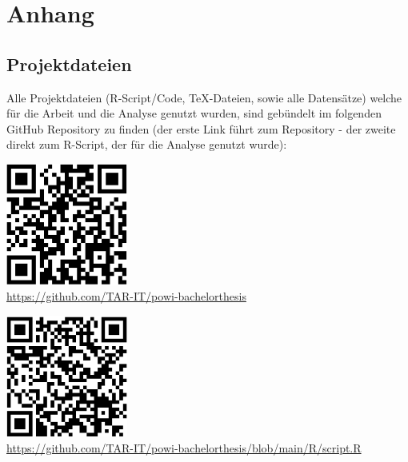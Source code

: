 
\section{Anhang}


\subsection{Projektdateien}

Alle Projektdateien (R-Script/Code, TeX-Dateien, sowie alle Datensätze) welche für die Arbeit und die 
Analyse genutzt wurden, sind gebündelt im folgenden GitHub Repository zu finden (der erste Link 
führt zum Repository - der zweite direkt zum R-Script, der für die Analyse genutzt wurde):

\vspace{2cm}

\begin{center}
    \includegraphics[width=0.3\textwidth]{assets/qrcode_repository.png}\\
    \small\url{https://github.com/TAR-IT/powi-bachelorthesis}
\end{center}

\vspace{2cm}

\begin{center}
    \includegraphics[width=0.3\textwidth]{assets/qrcode_script.png}\\
    \small\url{https://github.com/TAR-IT/powi-bachelorthesis/blob/main/R/script.R}
\end{center}
\newpage

